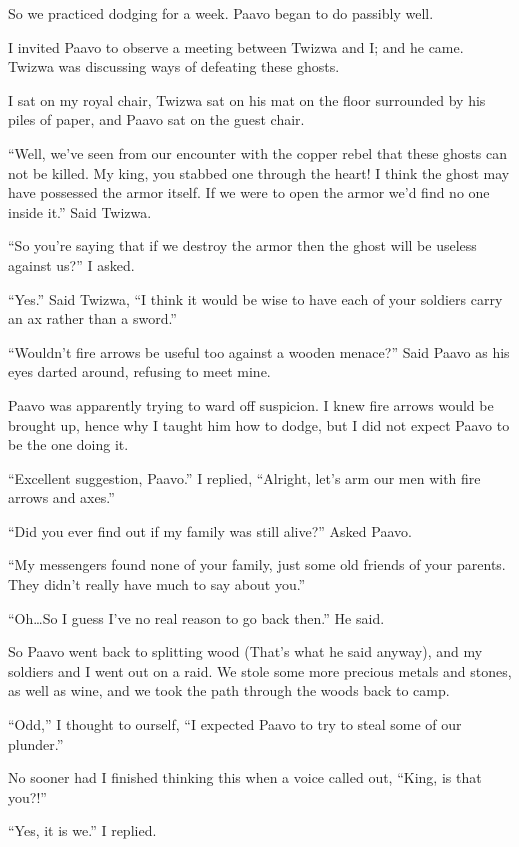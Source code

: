 So we practiced dodging for a week. Paa\-vo began to do passibly well.

I invited Paa\-vo to observe a meeting between Twi\-zwa and I; and he came. Twi\-zwa was discussing ways of defeating these ghosts.

I sat on my royal chair, Twi\-zwa sat on his mat on the floor surrounded by his piles of paper, and Paa\-vo sat on the guest chair.

``Well, we've seen from our encounter with the copper rebel that these ghosts can not be killed. My king, you stabbed one through the heart! I think the ghost may have possessed the armor itself. If we were to open the armor we'd find no one inside it.'' Said Twi\-zwa.

``So you're saying that if we destroy the armor then the ghost will be useless against us?'' I asked.

``Yes.'' Said Twi\-zwa, ``I think it would be wise to have each of your soldiers carry an ax rather than a sword.''

``Wouldn't fire arrows be useful too against a wooden menace?'' Said Paa\-vo as his eyes darted around, refusing to meet mine.

Paa\-vo was apparently trying to ward off suspicion. I knew fire arrows would be brought up, hence why I taught him how to dodge, but I did not expect Paa\-vo to be the one doing it.

``Excellent suggestion, Paa\-vo.'' I replied, ``Alright, let's arm our men with fire arrows and axes.''

``Did you ever find out if my family was still alive?'' Asked Paa\-vo.

``My messengers found none of your family, just some old friends of your parents. They didn't really have much to say about you.''

``Oh\ldots So I guess I've no real reason to go back then.'' He said.

So Paa\-vo went back to splitting wood (That's what he said anyway), and my soldiers and I went out on a raid.
We stole some more precious metals and stones, as well as wine, and we took the path through the woods back to camp.

``Odd,'' I thought to ourself, ``I expected Paa\-vo to try to steal some of our plunder.''

No sooner had I finished thinking this when a voice called out, ``King, is that you?!''

``Yes, it is we.'' I replied.

